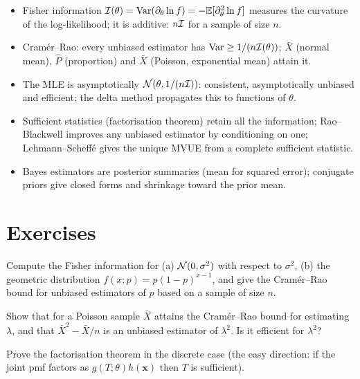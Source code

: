 \begin{summarybox}
\begin{itemize}
  \item Fisher information $\mathcal{I}(\theta)=\operatorname{Var}(\partial_\theta\ln f)=-\mathbb{E}[\partial_\theta^2\ln f]$ measures the curvature of the log-likelihood; it is additive: $n\mathcal{I}$ for a sample of size $n$.
  \item Cram\'er--Rao: every unbiased estimator has $\operatorname{Var}\ge1/(n\mathcal{I}(\theta))$; $\bar{X}$ (normal mean), $\hat{P}$ (proportion) and $\bar{X}$ (Poisson, exponential mean) attain it.
  \item The MLE is asymptotically $\mathcal{N}(\theta,1/(n\mathcal{I}))$: consistent, asymptotically unbiased and efficient; the delta method propagates this to functions of $\theta$.
  \item Sufficient statistics (factorisation theorem) retain all the information; Rao--Blackwell improves any unbiased estimator by conditioning on one; Lehmann--Scheff\'e gives the unique MVUE from a complete sufficient statistic.
  \item Bayes estimators are posterior summaries (mean for squared error); conjugate priors give closed forms and shrinkage toward the prior mean.
\end{itemize}
\end{summarybox}

\section{Exercises}

\begin{exercise}
Compute the Fisher information for (a) $\mathcal{N}(0,\sigma^2)$ with respect to $\sigma^2$, (b) the geometric distribution $f(x;p)=p(1-p)^{x-1}$, and give the Cram\'er--Rao bound for unbiased estimators of $p$ based on a sample of size $n$.
\end{exercise}

\begin{exercise}
Show that for a Poisson sample $\bar{X}$ attains the Cram\'er--Rao bound for estimating $\lambda$, and that $\bar{X}^2-\bar{X}/n$ is an unbiased estimator of $\lambda^2$. Is it efficient for $\lambda^2$?
\end{exercise}

\begin{exercise}
Prove the factorisation theorem in the discrete case (the easy direction: if the joint pmf factors as $g(T;\theta)h(\mathbf{x})$ then $T$ is sufficient).
\end{exercise}

